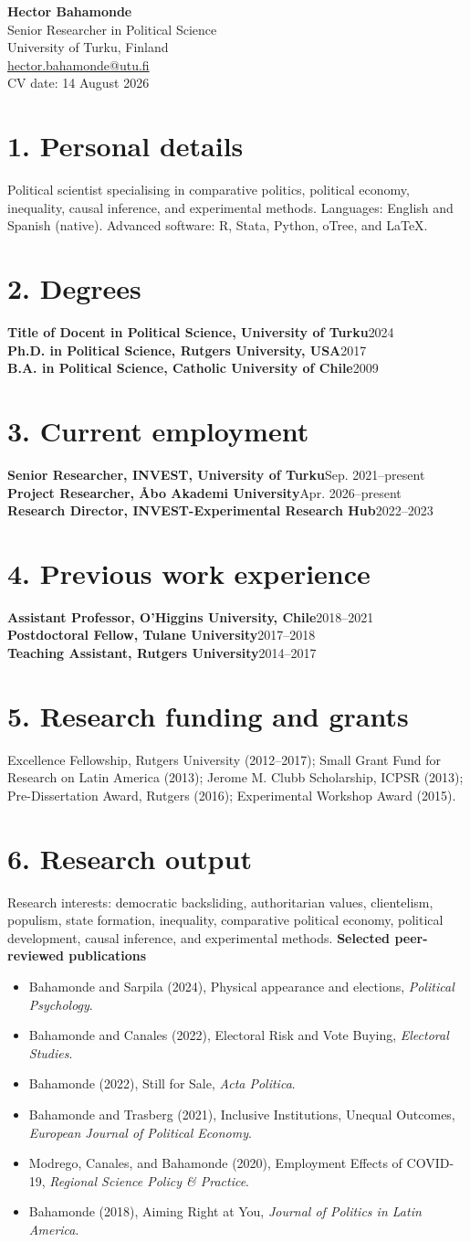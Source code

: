 \documentclass[10pt]{article}
\newcommand{\cvsec}[1]{\vspace{5pt}{\color{accent}\rule{\linewidth}{.6pt}}\vspace{-5pt}\section*{#1}\vspace{-5pt}}
\newcommand{\e}[2]{\textbf{#1}\hfill #2\\}
\begin{document}
\begin{center}{\LARGE\bfseries Hector Bahamonde}\\ Senior Researcher in Political Science\\ University of Turku, Finland\\ \href{mailto:hector.bahamonde@utu.fi}{hector.bahamonde@utu.fi}\\ CV date: 14 August 2026\end{center}
\cvsec{1. Personal details}
Political scientist specialising in comparative politics, political economy, inequality, causal inference, and experimental methods. Languages: English and Spanish (native). Advanced software: R, Stata, Python, oTree, and \LaTeX.
\cvsec{2. Degrees}
\e{Title of Docent in Political Science, University of Turku}{2024}\e{Ph.D. in Political Science, Rutgers University, USA}{2017}\e{B.A. in Political Science, Catholic University of Chile}{2009}
\cvsec{3. Current employment}
\e{Senior Researcher, INVEST, University of Turku}{Sep. 2021--present}\e{Project Researcher, Åbo Akademi University}{Apr. 2026--present}\e{Research Director, INVEST-Experimental Research Hub}{2022--2023}
\cvsec{4. Previous work experience}
\e{Assistant Professor, O'Higgins University, Chile}{2018--2021}\e{Postdoctoral Fellow, Tulane University}{2017--2018}\e{Teaching Assistant, Rutgers University}{2014--2017}
\cvsec{5. Research funding and grants}
Excellence Fellowship, Rutgers University (2012--2017); Small Grant Fund for Research on Latin America (2013); Jerome M. Clubb Scholarship, ICPSR (2013); Pre-Dissertation Award, Rutgers (2016); Experimental Workshop Award (2015).
\cvsec{6. Research output}
Research interests: democratic backsliding, authoritarian values, clientelism, populism, state formation, inequality, comparative political economy, political development, causal inference, and experimental methods.
\textbf{Selected peer-reviewed publications}\begin{itemize}\item Bahamonde and Sarpila (2024), Physical appearance and elections, \emph{Political Psychology}.\item Bahamonde and Canales (2022), Electoral Risk and Vote Buying, \emph{Electoral Studies}.\item Bahamonde (2022), Still for Sale, \emph{Acta Politica}.\item Bahamonde and Trasberg (2021), Inclusive Institutions, Unequal Outcomes, \emph{European Journal of Political Economy}.\item Modrego, Canales, and Bahamonde (2020), Employment Effects of COVID-19, \emph{Regional Science Policy \& Practice}.\item Bahamonde (2018), Aiming Right at You, \emph{Journal of Politics in Latin America}.\end{itemize}
\end{document}
